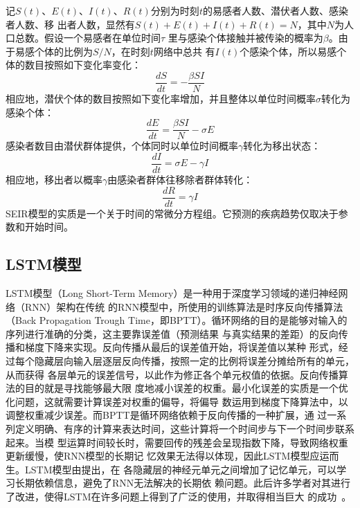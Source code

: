 \documentclass[lang=cn,11pt,a4paper,cite=authoryear]{elegantpaper}
\begin{document}
记$S(t)$、$E(t)$、$I(t)$、$R(t)$分别为时刻$t$的易感者人数、潜伏者人数、感染者人数、移
出者人数，显然有$S(t)+E(t)+I(t)+R(t)=N$，其中$N$为人口总数。假设一个易感者在单位时间$\tau$
里与感染个体接触并被传染的概率为$\beta$。由于易感个体的比例为$S/N$，在时刻$t$网络中总共
有$I(t)$个感染个体，所以易感个体的数目按照如下变化率变化：
\begin{equation}
\frac{dS}{dt}=-\frac{\beta SI}{N}
\end{equation}
相应地，潜伏个体的数目按照如下变化率增加，并且整体以单位时间概率$\sigma$转化为感染个体：
\begin{equation}
\frac{dE}{dt}=\frac{\beta SI}{N}-\sigma E
\end{equation}
感染者数目由潜伏群体提供，个体同时以单位时间概率$\gamma$转化为移出状态：
\begin{equation}
\frac{dI}{dt}=\sigma E-\gamma I
\end{equation}
相应地，移出者以概率$\gamma$由感染者群体往移除者群体转化：
\begin{equation}
\frac{dR}{dt}=\gamma I
\end{equation}
SEIR模型的实质是一个关于时间的常微分方程组。它预测的疾病趋势仅取决于参数和开始时间。

\subsection{LSTM模型}
LSTM模型（Long Short-Term Memory）是一种用于深度学习领域的递归神经网络（RNN）架构在传统
的RNN模型中，所使用的训练算法是时序反向传播算法（Back Propagation Trough 
Time，即BPTT）。循环网络的目的是能够对输入的序列进行准确的分类，这主要靠误差值（预测结果
与真实结果的差距）的反向传播和梯度下降来实现。反向传播从最后的误差值开始，将误差值以某种
形式，经过每个隐藏层向输入层逐层反向传播，按照一定的比例将误差分摊给所有的单元，从而获得
各层单元的误差信号，以此作为修正各个单元权值的依据。反向传播算法的目的就是寻找能够最大限
度地减小误差的权重。最小化误差的实质是一个优化问题，这就需要计算误差对权重的偏导，将偏导
数运用到梯度下降算法中，以调整权重减少误差。而BPTT是循环网络依赖于反向传播的一种扩展，通
过一系列定义明确、有序的计算来表达时间，这些计算将一个时间步与下一个时间步联系起来。当模
型运算时间较长时，需要回传的残差会呈现指数下降，导致网络权重更新缓慢，使RNN模型的长期记
忆效果无法得以体现，因此LSTM模型应运而生。LSTM模型由\cite{hochreiter1997lstm}提出，在
各隐藏层的神经元单元之间增加了记忆单元，可以学习长期依赖信息，避免了RNN无法解决的长期依
赖问题。此后许多学者对其进行了改进，使得LSTM在许多问题上得到了广泛的使用，并取得相当巨大
的成功~\citep{gers2000learning, graves2005bidirectional, graves2005framewise, 
schmidhuber2007training, bayer2009evolving, schaul2010pybrain, 
graves2013hybrid, bayer2014Learning}。
\end{document}
